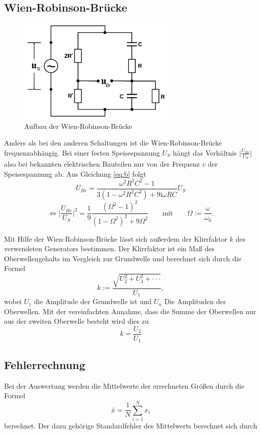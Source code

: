 \subsection{Wien-Robinson-Brücke}
\begin{figure}[H]
\centering
    \includegraphics[height= 5cm]{content/Wien-Robinson.png}
    \caption{Aufbau der Wien-Robinson-Brücke\cite[223]{sample}}
\end{figure}
\noindent Anders als bei den anderen Schaltungen ist
die Wien-Robinson-Brücke frequenzabhängig. Bei einer
festen Speisespannung $U_S$ hängt das Verhältnis
$\lvert{\frac{U_{Br}}{U_S}}\rvert$
also bei bekannten elektrischen Bauteilen
nur von der Frequenz $v$ der Speisespannung ab.
Aus Gleichung \ref{eq:b} folgt
\begin{equation}
    U_{Br}=\frac{\omega^2R^2C^2-1}{3(1-\omega^2R^2C^2)+9\text{i}\omega RC}U_S
\end{equation}
\begin{equation}
    \iff \Big|\frac{U_{Br}}{U_S}\Bigr| ^2=\frac{1}{9}\frac{(\Omega ^2 -1)^2}{(1-\Omega ^2)^2+9\Omega ^2} \qquad \text{mit} \qquad \Omega := \frac{\omega}{\omega_0}.
\end{equation}

\noindent Mit Hilfe der Wien-Robinson-Brücke lässt
sich außerdem der Klirrfaktor $k$ des verwendeten Generators
bestimmen. Der Klirrfaktor ist ein Maß des
Oberwellengehalts im Vergleich zur Grundwelle und berechnet
sich durch die Formel
\begin{equation}
    k:=\frac{\sqrt{U_2^2+U_3^2+\cdot \cdot \cdot }}{U_{1}},
\end{equation}
\noindent wobei $U_1$ die Amplitude der Grundwelle
ist und $U_n$ Die Amplituden der Oberwellen.
Mit der vereinfachten Annahme, dass die Summe der
Oberwellen nur aus der zweiten Oberwelle besteht wird
dies zu
\begin{equation}
    k=\frac{U_2}{U_1}
\end{equation}



\subsection{Fehlerrechnung}
Bei der Auswertung werden die Mittelwerte 
der errechneten Größen durch die Formel
\begin{equation}
    \bar{x}=\frac{1}{N}\sum_{i=1}^N x_i
\end{equation}
berechnet. Der dazu gehörige Standardfehler
des Mittelwerts berechnet sich durch

